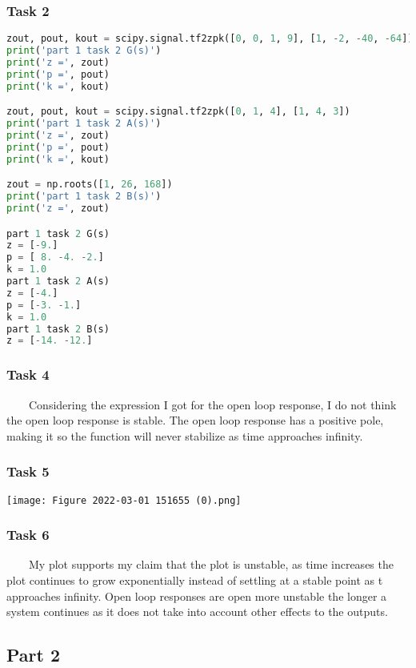 \documentclass[11pt,a4]{article}
\begin{document}
\subsubsection{Task 2}

\begin{lstlisting}[language=Python]
zout, pout, kout = scipy.signal.tf2zpk([0, 0, 1, 9], [1, -2, -40, -64])
print('part 1 task 2 G(s)')
print('z =', zout)
print('p =', pout)
print('k =', kout)

zout, pout, kout = scipy.signal.tf2zpk([0, 1, 4], [1, 4, 3])
print('part 1 task 2 A(s)')
print('z =', zout)
print('p =', pout)
print('k =', kout)

zout = np.roots([1, 26, 168])
print('part 1 task 2 B(s)')
print('z =', zout)

part 1 task 2 G(s)
z = [-9.]
p = [ 8. -4. -2.]
k = 1.0
part 1 task 2 A(s)
z = [-4.]
p = [-3. -1.]
k = 1.0
part 1 task 2 B(s)
z = [-14. -12.]
\end{lstlisting}

\subsubsection{Task 4}

\ \ \ \ Considering the expression I got for the open loop response, I do not think the open loop response is stable. The open loop response has a positive pole, making it so the function will never stabilize as time approaches infinity.

\subsubsection{Task 5}

\texttt{[image: Figure 2022-03-01 151655 (0).png]}

\subsubsection{Task 6}

\ \ \ \ My plot supports my claim that the plot is unstable, as time increases the plot continues to grow exponentially instead of settling at a stable point as t approaches infinity. Open loop responses are open more unstable the longer a system continues as it does not take into account other effects to the outputs.

\subsection{Part 2}
\end{document}

